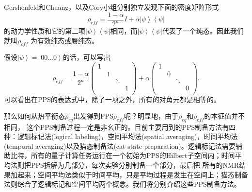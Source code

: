 Gershenfeld和Chuang\cite{nmrpro2}，以及Cory小组\cite{nmrpro1}分别独立发现下面的密度矩阵形式
\begin{equation}\label{aaa}
\rho_{eff} = \frac{1-\alpha}{2^n}I +\alpha \left\vert \psi \right \rangle \left\langle \psi \right \vert
\end{equation}
的动力学性质和它的第二项$\left\vert \psi \right \rangle \left\langle \psi \right \vert$相同，而$\left\vert \psi \right \rangle \left\langle \psi \right \vert$代表了一个纯态。因此我们就叫$\rho_{eff} $ 为有效纯态或赝纯态。

假设$\left\vert \psi \right \rangle = \left\vert 00\ldots 0 \right \rangle$的话，可以写出
 \begin{equation}\label{aaa}
\rho_{eff} = \frac{1-\alpha}{2^n}\left(
                                   \begin{array}{cccc}
                                     1 &  &  &  \\
                                      & 1 &  &  \\
                                      &  & \ddots &  \\
                                      &  &  & 1 \\
                                   \end{array}
                                 \right)
 +\alpha \left(
                                   \begin{array}{cccc}
                                     1 &  &  &  \\
                                      & 0 &  &  \\
                                      &  & \ddots &  \\
                                      &  &  & 0 \\
                                   \end{array}
                                 \right).
\end{equation}
可以看出在PPS的表达式中，除了一项之外，所有的对角元都是相等的。

那么如何从热平衡态$\rho_{eq}$出发得到PPS$\rho_{eff}$呢？明显地，由于$\rho_{eq}$和$\rho_{eff}$的本征值并不相同，
这个PPS制备过程一定是非幺正的。目前主要用到的PPS制备方法有四种：逻辑标记法(logical labeling)\cite{nmrpro2}，空间平均法(spatial averaging)\cite{nmrpro1}，时间平均法(temporal averaging)\cite{pps2}以及猫态制备法(cat-state preparation)\cite{pps2}。逻辑标记法需要辅助比特，所有的量子计算任务运行在一个初始为PPS的Hilbert子空间内；时间平均法则把PPS拆解为几部分，每次实验分别制备一个部分，最后把
所有的NMR结果加起来；空间平均法类似于时间平均，只是平均过程是发生在空间上；猫态制备法则综合了逻辑标记和空间平均两个概念。我们将分别介绍这些PPS制备方法。

